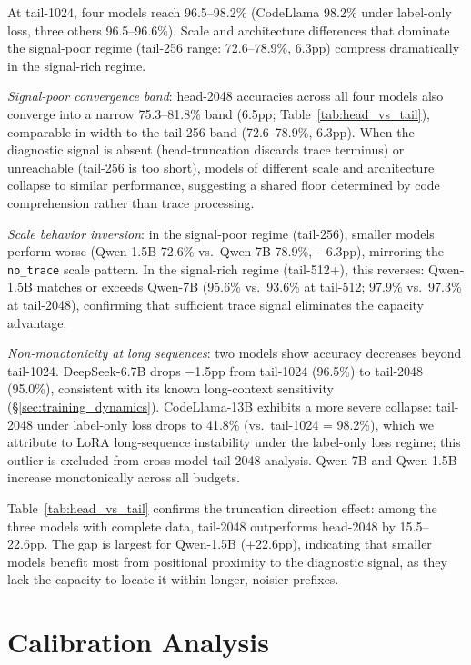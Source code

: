 At tail-1024, four models reach 96.5--98.2\% (CodeLlama 98.2\% under label-only loss, three others 96.5--96.6\%).
Scale and architecture differences that dominate the signal-poor regime (tail-256 range: 72.6--78.9\%, 6.3pp) compress dramatically in the signal-rich regime.

\emph{Signal-poor convergence band}: head-2048 accuracies across all four models also converge into a narrow 75.3--81.8\% band (6.5pp; Table~\ref{tab:head_vs_tail}), comparable in width to the tail-256 band (72.6--78.9\%, 6.3pp).
When the diagnostic signal is absent (head-truncation discards trace terminus) or unreachable (tail-256 is too short), models of different scale and architecture collapse to similar performance, suggesting a shared floor determined by code comprehension rather than trace processing.

\emph{Scale behavior inversion}: in the signal-poor regime (tail-256), smaller models perform worse (Qwen-1.5B 72.6\% vs.\ Qwen-7B 78.9\%, $-$6.3pp), mirroring the \texttt{no\_trace} scale pattern.
In the signal-rich regime (tail-512+), this reverses: Qwen-1.5B matches or exceeds Qwen-7B (95.6\% vs.\ 93.6\% at tail-512; 97.9\% vs.\ 97.3\% at tail-2048), confirming that sufficient trace signal eliminates the capacity advantage.

\emph{Non-monotonicity at long sequences}: two models show accuracy decreases beyond tail-1024.
DeepSeek-6.7B drops $-$1.5pp from tail-1024 (96.5\%) to tail-2048 (95.0\%), consistent with its known long-context sensitivity (\S\ref{sec:training_dynamics}).
CodeLlama-13B exhibits a more severe collapse: tail-2048 under label-only loss drops to 41.8\% (vs.\ tail-1024 = 98.2\%), which we attribute to LoRA long-sequence instability under the label-only loss regime; this outlier is excluded from cross-model tail-2048 analysis.
Qwen-7B and Qwen-1.5B increase monotonically across all budgets.

Table~\ref{tab:head_vs_tail} confirms the truncation direction effect: among the three models with complete data, tail-2048 outperforms head-2048 by 15.5--22.6pp.
The gap is largest for Qwen-1.5B (+22.6pp), indicating that smaller models benefit most from positional proximity to the diagnostic signal, as they lack the capacity to locate it within longer, noisier prefixes.

\section{Calibration Analysis}
\label{sec:calibration_full}

